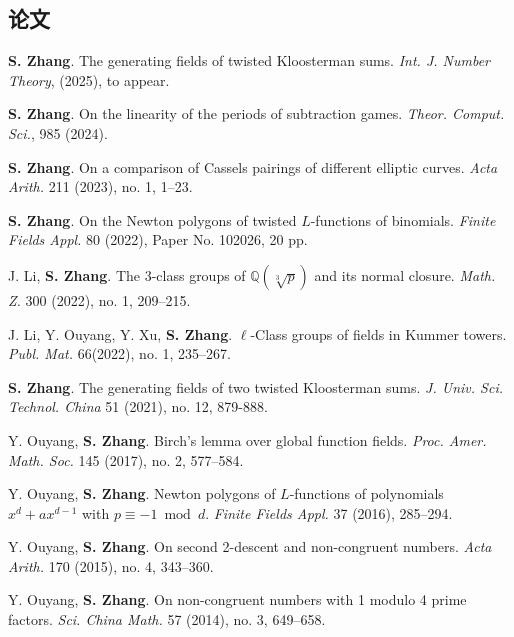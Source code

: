 \documentclass[11pt]{article}
\begin{document}
\subsection{论文}
\begin{cvlist}
	\item \textbf{S. Zhang}.
	The generating fields of twisted Kloosterman sums.
	{\em Int. J. Number Theory}, (2025), to appear.
	
	\item \textbf{S. Zhang}.
	On the linearity of the periods of subtraction games.
	{\em Theor. Comput. Sci.}, 985 (2024).
	
	\item \textbf{S. Zhang}.
	On a comparison of Cassels pairings of different elliptic curves.
	{\em Acta Arith.} 211 (2023), no. 1, 1--23.

	\item \textbf{S. Zhang}.
	On the Newton polygons of twisted $L$-functions of binomials.
	{\em Finite Fields Appl.} 80 (2022), Paper No. 102026, 20 pp.

	\item J. Li, \textbf{S. Zhang}.
	The $3$-class groups of $\mathbb{Q}(\sqrt[3]{p})$ and its normal closure.
	{\em Math. Z.} 300 (2022), no. 1, 209--215.

	\item J. Li, Y. Ouyang, Y. Xu, \textbf{S. Zhang}.
	$\ell$-Class groups of fields in Kummer towers.
	{\em Publ. Mat.} 66(2022), no. 1, 235--267.

	\item \textbf{S. Zhang}.
	The generating fields of two twisted Kloosterman sums.
	{\em J. Univ. Sci. Technol. China} 51 (2021), no. 12, 879-888.

	\item Y. Ouyang, \textbf{S. Zhang}.
	Birch's lemma over global function fields.
	{\em Proc. Amer. Math. Soc.} 145 (2017), no. 2, 577--584.

	\item Y. Ouyang, \textbf{S. Zhang}.
	Newton polygons of $L$-functions of polynomials $x^d+ax^{d-1}$ with $p\equiv -1 \bmod d$.
	{\em Finite Fields Appl.} 37 (2016), 285--294.

	\item Y. Ouyang, \textbf{S. Zhang}.
	On second 2-descent and non-congruent numbers.
	{\em Acta Arith.} 170 (2015), no. 4, 343--360.

	\item Y. Ouyang, \textbf{S. Zhang}.
	On non-congruent numbers with 1 modulo 4 prime factors.
	{\em Sci. China Math.} 57 (2014), no. 3, 649--658.
\end{cvlist}
\end{document}

